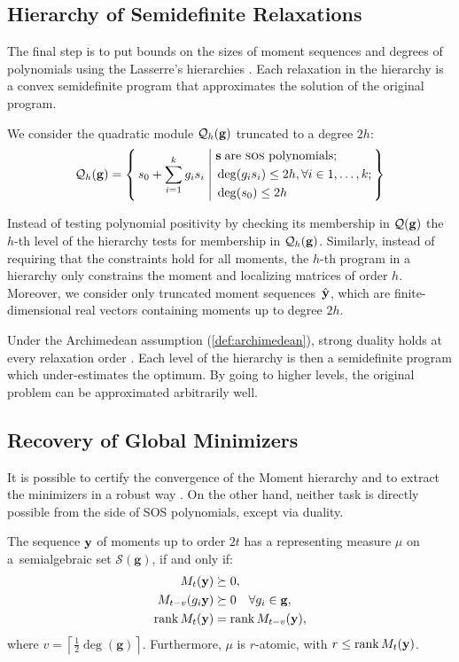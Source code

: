 \subsection{Hierarchy of Semidefinite Relaxations}
The final step is to put bounds on the sizes of moment sequences and degrees of polynomials using the Lasserre's hierarchies \cite[Chapter 6]{Lasserre15:book}. Each relaxation in the hierarchy is a convex semidefinite program that approximates the solution of the original program.

We consider the quadratic module $\mathcal{Q}_h(\mathbf{g})$ truncated to a degree $2h$:
\[
\mathcal{Q}_h(\mathbf{g}) = \left\{\, s_0 + \sum_{i=1}^k g_is_i \;\middle|\; {}
   \begin{aligned}[c]
    & \mathbf{s} \; \text{are \textsc{sos} polynomials}; \\
    & \deg(g_is_i)\le 2h, \forall i\in 1,\dots,k; \\
    & \deg(s_0)\le 2h
   \end{aligned}\,\right\}
\]

Instead of testing polynomial positivity by checking its membership in $\mathcal{Q}(\mathbf{g})$ the $h$-th level of the hierarchy tests for membership in $\mathcal{Q}_h(\mathbf{g})$. Similarly, instead of requiring that the constraints hold for all moments, the $h$-th program in a hierarchy only constrains the moment and localizing matrices of order $h$. Moreover, we consider only truncated moment sequences~$\hat{\mathbf{y}}$, which are finite-dimensional real vectors containing moments up to degree $2h$.

Under the Archimedean assumption (\cref{def:archimedean}), strong duality holds at every relaxation order \cite{josz2016:duality}. Each level of the hierarchy is then a semidefinite program which under-estimates the optimum. By going to higher levels, the original problem can be approximated arbitrarily well.

\subsection{Recovery of Global Minimizers}
It is possible to certify the convergence of the Moment hierarchy \cite{Laurent2009,lasserre2009moments,fialkow1991recursiveness} and to extract the minimizers in a robust way \cite{klep2018minimizer}. On the other hand, neither task is directly possible from the side of SOS polynomials, except via duality.

\begin{theorem}
The sequence $\mathbf{y}$ of moments up to order $2t$ has a representing measure $\mu$ on a~semialgebraic set $\mathcal{S}(\mathbf{g})$, if and only if:
\[\begin{aligned}
    M_t(\mathbf{y}) &\succeq 0,\\
    M_{t-v}(g_i\mathbf{y}) &\succeq 0 \quad \forall g_i\in \mathbf{g},\\
    \operatorname*{rank} M_{t}(\mathbf{y}) &= \operatorname*{rank} M_{t-v}(\mathbf{y}),
\end{aligned}
\]
where $v = \left\lceil \frac{1}{2} \deg(\mathbf{g}) \right\rceil$. Furthermore, $\mu$ is $r$-atomic, with $r\leq\operatorname*{rank} M_t(\mathbf{y})$.
\end{theorem}

